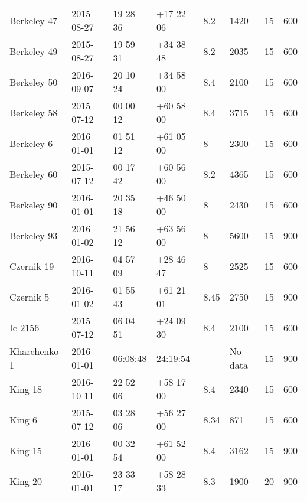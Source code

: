 \documentclass{jaa}
\begin{document}
\begin{table*}
\begin{tabular}{llllllll}
Berkeley 47       & 2015-08-27          & 19 28 36      & +17 22 06      & 8.2       & 1420          & 15          & 600           \\
Berkeley 49       & 2015-08-27          & 19 59 31      & +34 38 48      & 8.2       & 2035          & 15          & 600           \\
Berkeley 50       & 2016-09-07          & 20 10 24      & +34 58 00      & 8.4       & 2100          & 15          & 600           \\
Berkeley 58       & 2015-07-12          & 00 00 12      & +60 58 00      & 8.4       & 3715          & 15          & 600           \\
Berkeley 6        & 2016-01-01          & 01 51 12      & +61 05 00      & 8        & 2300          & 15          & 600           \\
Berkeley 60       & 2015-07-12          & 00 17 42      & +60 56 00      & 8.2       & 4365          & 15          & 600           \\
Berkeley 90       & 2016-01-01          & 20 35 18      & +46 50 00      & 8        & 2430          & 15          & 600           \\
Berkeley 93       & 2016-01-02          & 21 56 12      & +63 56 00      & 8        & 5600          & 15          & 900           \\
Czernik 19       & 2016-10-11          & 04 57 09      & +28 46 47      & 8        & 2525          & 15          & 600           \\
Czernik 5        & 2016-01-02          & 01 55 43      & +61 21 01      & 8.45       & 2750          & 15          & 900           \\
Ic 2156         & 2015-07-12          & 06 04 51      & +24 09 30      & 8.4       & 2100          & 15          & 600           \\
Kharchenko 1      & 2016-01-01          & 06:08:48      & 24:19:54       &         & No data         & 15          & 900           \\
King 18         & 2016-10-11          & 22 52 06      & +58 17 00      & 8.4       & 2340          & 15          & 600           \\
King 6         & 2015-07-12          & 03 28 06      & +56 27 00      & 8.34       & 871           & 15          & 600           \\
King 15         & 2016-01-01          & 00 32 54      & +61 52 00      & 8.4       & 3162          & 15          & 900           \\
King 20         & 2016-01-01          & 23 33 17      & +58 28 33      & 8.3       & 1900          & 20          & 900           \\

\end{tabular}
\end{table*}
\end{document}
